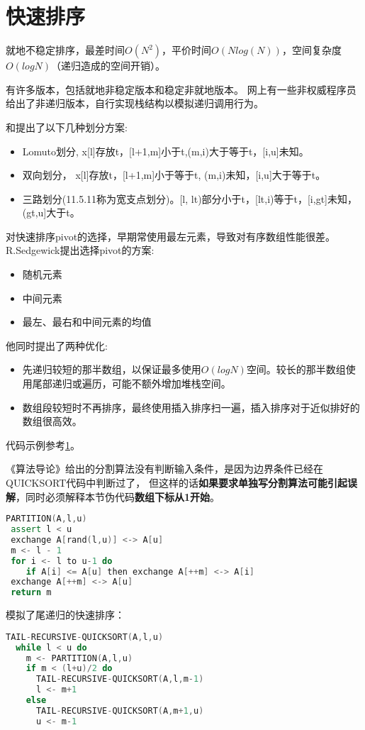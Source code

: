 
\section{快速排序}
\label{codes:quicksort}
就地不稳定排序，最差时间$O(N^2)$，平价时间$O(Nlog(N))$，空间复杂度$O(logN)$（递归造成的空间开销）。


有许多版本，包括就地非稳定版本和稳定非就地版本。
网上有一些非权威程序员给出了非递归版本，自行实现栈结构以模拟递归调用行为。

\cite{pp}和\cite{sedgewick}提出了以下几种划分方案:
\begin{itemize}
    \item 
	Lomuto划分, x[l]存放t，[l+1,m]小于t,(m,i)大于等于t，[i,u]未知。
    \item 
	双向划分， x[l]存放t，[l+1,m]小于等于t, (m,i)未知，[i,u]大于等于t。
    \item 
	三路划分(\cite{pp}11.5.11称为宽支点划分)。[l, lt)部分小于t，[lt,i)等于t，[i,gt]未知，(gt,u]大于t。
\end{itemize}


对快速排序pivot的选择，早期常使用最左元素，导致对有序数组性能很差。R.Sedgewick提出\cite{wikipedia}选择pivot的方案:
\begin{itemize}
    \item 随机元素
    \item 中间元素
    \item 最左、最右和中间元素的均值
\end{itemize}

他同时提出了两种优化:
\begin{itemize}
    \item 先递归较短的那半数组，以保证最多使用$O(logN)$空间。较长的那半数组使用尾部递归或遍历，可能不额外增加堆栈空间。
    \item 数组段较短时不再排序，最终使用插入排序扫一遍，插入排序对于近似排好的数组很高效。
\end{itemize}

代码示例参考\ref{codes:quicksort}。




《算法导论》给出的分割算法没有判断输入条件，是因为边界条件已经在QUICKSORT代码中判断过了，
但这样的话\textbf{如果要求单独写分割算法可能引起误解}，同时必须解释本节伪代码\textbf{数组下标从1开始}。

\begin{lstlisting}[language=C++]
PARTITION(A,l,u) 
 assert l < u
 exchange A[rand(l,u)] <-> A[u]
 m <- l - 1 
 for i <- l to u-1 do
    if A[i] <= A[u] then exchange A[++m] <-> A[i] 
 exchange A[++m] <-> A[u] 
 return m
\end{lstlisting}
模拟了尾递归的快速排序：
\begin{lstlisting}[language=C++]
TAIL-RECURSIVE-QUICKSORT(A,l,u)
  while l < u do
    m <- PARTITION(A,l,u)
    if m < (l+u)/2 do
      TAIL-RECURSIVE-QUICKSORT(A,l,m-1)
      l <- m+1
    else
      TAIL-RECURSIVE-QUICKSORT(A,m+1,u)
      u <- m-1
\end{lstlisting}




